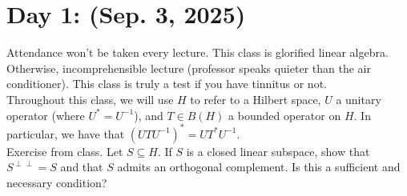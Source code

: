 \section{Day 1: (Sep. 3, 2025)}
Attendance won't be taken every lecture. This class is glorified linear algebra. Otherwise, incomprehensible lecture (professor speaks quieter than the air conditioner). This class is truly a test if you have tinnitus or not.
\\[8pt]
Throughout this class, we will use $H$ to refer to a Hilbert space, $U$ a unitary operator (where $U^\ast = U^{-1}$), and $T \in B(H)$ a bounded operator on $H$. In particular, we have that $(UTU^{-1})^\ast = UT^\ast U^{-1}$.
\\[8pt]
Exercise from class. Let $S \subseteq H$. If $S$ is a closed linear subspace, show that $S^{\perp \perp} = S$ and that $S$ admits an orthogonal complement. Is this a sufficient and necessary condition?